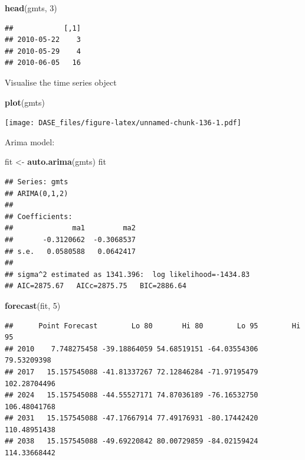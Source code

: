 \documentclass[]{book}
\newenvironment{Shaded}{\begin{snugshade}}{\end{snugshade}}
\newcommand{\KeywordTok}[1]{\textcolor[rgb]{0.13,0.29,0.53}{\textbf{{#1}}}}
\newcommand{\DecValTok}[1]{\textcolor[rgb]{0.00,0.00,0.81}{{#1}}}
\newcommand{\StringTok}[1]{\textcolor[rgb]{0.31,0.60,0.02}{{#1}}}
\newcommand{\NormalTok}[1]{{#1}}
\begin{document}
\begin{Shaded}
\begin{Highlighting}[]
\KeywordTok{head}\NormalTok{(gmts, }\DecValTok{3}\NormalTok{)}
\end{Highlighting}
\end{Shaded}

\begin{verbatim}
##            [,1]
## 2010-05-22    3
## 2010-05-29    4
## 2010-06-05   16
\end{verbatim}

Visualise the time series object

\begin{Shaded}
\begin{Highlighting}[]
\KeywordTok{plot}\NormalTok{(gmts)}
\end{Highlighting}
\end{Shaded}

\texttt{[image: DASE\_files/figure-latex/unnamed-chunk-136-1.pdf]}

Arima model:

\begin{Shaded}
\begin{Highlighting}[]
\NormalTok{fit <-}\StringTok{ }\KeywordTok{auto.arima}\NormalTok{(gmts)}
\NormalTok{fit}
\end{Highlighting}
\end{Shaded}

\begin{verbatim}
## Series: gmts 
## ARIMA(0,1,2)                    
## 
## Coefficients:
##              ma1         ma2
##       -0.3120662  -0.3068537
## s.e.   0.0580588   0.0642417
## 
## sigma^2 estimated as 1341.396:  log likelihood=-1434.83
## AIC=2875.67   AICc=2875.75   BIC=2886.64
\end{verbatim}

\begin{Shaded}
\begin{Highlighting}[]
\KeywordTok{forecast}\NormalTok{(fit, }\DecValTok{5}\NormalTok{)}
\end{Highlighting}
\end{Shaded}

\begin{verbatim}
##      Point Forecast        Lo 80       Hi 80        Lo 95        Hi 95
## 2010    7.748275458 -39.18864059 54.68519151 -64.03554306  79.53209398
## 2017   15.157545088 -41.81337267 72.12846284 -71.97195479 102.28704496
## 2024   15.157545088 -44.55527171 74.87036189 -76.16532750 106.48041768
## 2031   15.157545088 -47.17667914 77.49176931 -80.17442420 110.48951438
## 2038   15.157545088 -49.69220842 80.00729859 -84.02159424 114.33668442
\end{verbatim}
\end{document}
